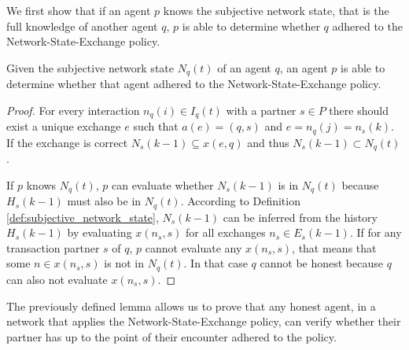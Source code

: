 

We first show that if an agent $p$ knows the subjective network state, that is the full knowledge of 
another agent $q$, $p$ is able to determine whether $q$ adhered to the Network-State-Exchange policy.


\begin{lem}
    \label{lem:detection_free-rider}
    Given the subjective network state $N_q(t)$ of an agent $q$, an agent $p$ is able to 
    determine whether that agent adhered to the Network-State-Exchange policy.
\end{lem}
\begin{proof}
    For every interaction $n_q(i) \in I_q(t)$ with a partner $s \in P$ there should exist a 
    unique exchange $e$ such that $a(e) = (q,s)$ and $e = n_q(j) = n_s(k)$. If the exchange
    is correct $N_s(k-1) \subseteq x(e,q)$ and thus $N_s(k-1) \subset N_q(t)$. 
    
    If $p$ knows $N_q(t)$, $p$ can evaluate whether $N_s(k-1)$ is in $N_q(t)$ because $H_s(k-1)$ 
    must also be in $N_q(t)$. According to Definition \ref{def:subjective_network_state}, $N_s(k-1)$ 
    can be inferred from the 
    history $H_s(k-1)$ by evaluating $x(n_s, s)$ for all exchanges $n_s \in E_s(k-1)$. 
    If for any transaction partner $s$ of $q$, $p$ cannot evaluate any $x(n_s, s)$, that means that some $n \in x(n_s, s)$ 
    is not in $N_q(t)$. In that case $q$ cannot be honest because $q$ can also not evaluate 
    $x(n_s, s)$.
\end{proof}

The previously defined lemma allows us to prove that any honest agent, in a network that applies the
Network-State-Exchange policy, can verify whether their partner has up to the point of their encounter
adhered to the policy.

